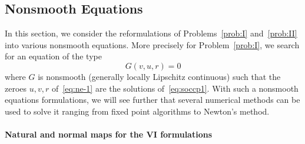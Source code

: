 \subsection{Nonsmooth Equations}
\label{Sec:NonsmoothEquations}
In this section, we consider the reformulations of Problems~\ref{prob:I} and~\ref{prob:II} into various nonsmooth equations. More precisely for Problem~\ref{prob:I}, we search for an equation of the type
\begin{equation}
  \label{eq:ne-1}
  G(v,u,r) = 0
\end{equation}
where $G$ is nonsmooth (generally locally Lipschitz continuous) such that the zeroes $u,v,r$ of~\eqref{eq:ne-1} are the solutions of~\eqref{eq:soccp1}. With such a nonsmooth equations formulations, we will see further that several numerical methods can be used to solve it ranging from fixed point algorithms to Newton's method.

\paragraph{Natural and normal maps for the VI formulations}

